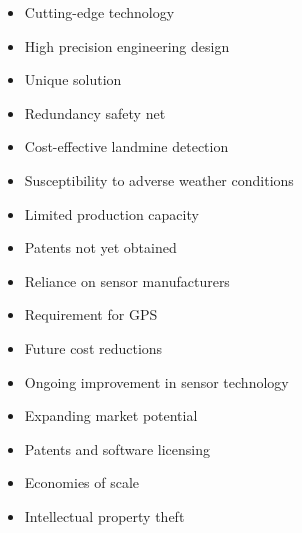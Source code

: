 \begin{figure}[H]
\centering
\begin{tcbraster}[raster columns=2, boxrule=0mm, arc=0mm]
\begin{tcolorbox}[equal height group=A, size=fbox, colback=swotS!60, colframe=swotS!80!black, title=\textsc{\textbf{STRENGTHS}}]
\begin{itemize}
    \item Cutting-edge technology
    \item High precision engineering design
    \item Unique solution
    \item Redundancy safety net
    \item Cost-effective landmine detection
\end{itemize}
\end{tcolorbox}
\begin{tcolorbox}[equal height group=A, size=fbox, colback=swotW!60, colframe=swotW!80!black, title=\textsc{\textbf{WEAKNESSES}}]
\begin{itemize}
    \item Susceptibility to adverse weather conditions
    \item Limited production capacity
    \item Patents not yet obtained
    \item Reliance on sensor manufacturers
    \item Requirement for GPS
\end{itemize}
\end{tcolorbox}
\begin{tcolorbox}[equal height group=A, size=fbox, colback=swotO!60, colframe=swotO!80!black, title=\textsc{\textbf{OPPORTUNITIES}}]
\begin{itemize}
    \item Future cost reductions
    \item Ongoing improvement in sensor technology
    \item Expanding market potential
    \item Patents and software licensing
    \item Economies of scale
\end{itemize}
\end{tcolorbox}
\begin{tcolorbox}[equal height group=A, size=fbox, colback=swotT!60, colframe=swotT!80!black, title=\textsc{\textbf{THREATS}}]
\begin{itemize}
    \item Intellectual property theft

\end{itemize}
\end{tcolorbox}
\end{tcbraster}
\end{figure}
